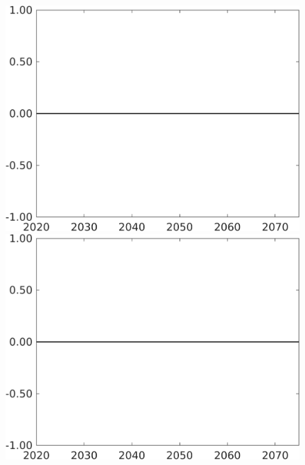 \documentclass[12pt]{article}
\begin{document}
\begin{figure}[h!!]
\begin{minipage}[]{0.32\textwidth}
	\end{minipage}		
	\begin{minipage}[]{0.32\textwidth}
		\includegraphics[width=1\textwidth]{../../codding_model/own_basedOnFried/optimalPol_010922_revision/figures/all_13Sept22/CompTaufPER_bytaul_Reg0_sff_spillover0_nsk0_xgr1_knspil0_sep0_LFlimit1_emsbase0_countec0_GovRev0_etaa0.79_lgd0.png}
	\end{minipage}		
	\begin{minipage}[]{0.32\textwidth}
		\includegraphics[width=1\textwidth]{../../codding_model/own_basedOnFried/optimalPol_010922_revision/figures/all_13Sept22/CompTaufPER_bytaul_Reg0_sg_spillover0_nsk0_xgr1_knspil0_sep0_LFlimit1_emsbase0_countec0_GovRev0_etaa0.79_lgd0.png}

\end{minipage}
\end{figure}
\end{document}
